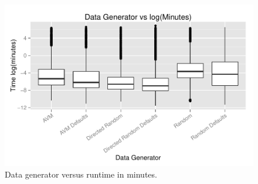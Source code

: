 \begin{figure}
\centering
  \centering
  \includegraphics[width=1\linewidth]{diagrams/DataGeneratorvsTime.pdf}
  \caption{Data generator versus runtime in minutes.\vspace{-.15in}}
  \label{fig:datas}
  \vspace{-.15in} 
\end{figure}


